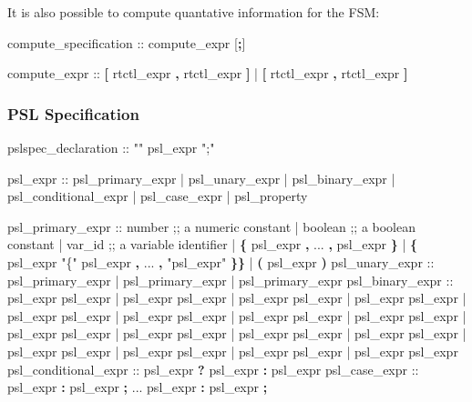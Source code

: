 It is also possible to compute quantative information for the FSM:

\begin{Grammar}
compute_specification ::  compute_expr [\textbf{;}]
\end{Grammar}

\begin{Grammar}
compute_expr ::  \textbf{[} rtctl_expr \textbf{,} rtctl_expr \textbf{]}
              |  \textbf{[} rtctl_expr \textbf{,} rtctl_expr \textbf{]}
\end{Grammar}


\subsubsection{PSL Specification}
%
\begin{Grammar}
pslspec_declaration :: "" psl_expr ";"
\end{Grammar}
%
\begin{Grammar}
psl_expr ::
   psl_primary_expr
 | psl_unary_expr
 | psl_binary_expr
 | psl_conditional_expr
 | psl_case_expr
 | psl_property
\end{Grammar}
%
\begin{Grammar}
psl_primary_expr ::
   number                              ;; a numeric constant
 | boolean                             ;; a boolean constant
 | var_id                              ;; a variable identifier
 | \textbf{\{} psl_expr \textbf{,} ... \textbf{,} psl_expr \textbf{\}}
 | \textbf{\{} psl_expr "\{" psl_expr \textbf{,} ... \textbf{,} "psl_expr" \textbf{\}}\textbf{\}}
 | \textbf{(} psl_expr \textbf{)}
psl_unary_expr ::
   \operator{+} psl_primary_expr     
 | \operator{-} psl_primary_expr  
 | \operator{!} psl_primary_expr  
psl_binary_expr ::
   psl_expr \operator{+} psl_expr    
 | psl_expr  psl_expr 
 | psl_expr  psl_expr 
 | psl_expr \operator{-} psl_expr   
 | psl_expr \operator{*}psl_expr   
 | psl_expr \operator{/} psl_expr   
 | psl_expr \operator{\%} psl_expr 
 | psl_expr \operator{==} psl_expr    
 | psl_expr \operator{!=} psl_expr  
 | psl_expr \operator{<} psl_expr       
 | psl_expr \operator{<=} psl_expr       
 | psl_expr \operator{>} psl_expr       
 | psl_expr \operator{>=} psl_expr       
 | psl_expr \operator{&} psl_expr 
 | psl_expr \operator{|} psl_expr 
 | psl_expr  psl_expr 
psl_conditional_expr ::
 psl_expr \textbf{?} psl_expr \textbf{:} psl_expr 
psl_case_expr ::
     psl_expr \textbf{:} psl_expr \textbf{;}
     ...
     psl_expr \textbf{:} psl_expr \textbf{;}
\end{Grammar}
